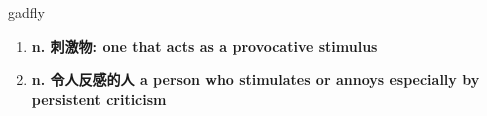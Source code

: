 
\begin{frame}
{\huge gadfly}
\begin{center}
\begin{enumerate}\Large
  \item \textbf{n. 刺激物: one that acts as a provocative stimulus}
  \item \textbf{n. 令人反感的人 a person who stimulates or annoys especially by persistent criticism}
\end{enumerate}
\end{center}
\end{frame}
